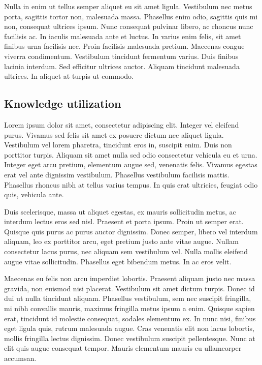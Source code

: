 \documentclass[10pt]{article}
\begin{document}
	Nulla in enim ut tellus semper aliquet eu sit amet ligula. Vestibulum nec metus porta, sagittis tortor non, malesuada massa. Phasellus enim odio, sagittis quis mi non, consequat ultrices ipsum. Nunc consequat pulvinar libero, ac rhoncus nunc facilisis ac. In iaculis malesuada ante et luctus. In varius enim felis, sit amet finibus urna facilisis nec. Proin facilisis malesuada pretium. Maecenas congue viverra condimentum. Vestibulum tincidunt fermentum varius. Duis finibus lacinia interdum. Sed efficitur ultrices auctor. Aliquam tincidunt malesuada ultrices. In aliquet at turpis ut commodo.
		
	
	\subsection{Knowledge utilization}
	
	Lorem ipsum dolor sit amet, consectetur adipiscing elit. Integer vel eleifend purus. Vivamus sed felis sit amet ex posuere dictum nec aliquet ligula. Vestibulum vel lorem pharetra, tincidunt eros in, suscipit enim. Duis non porttitor turpis. Aliquam sit amet nulla sed odio consectetur vehicula eu et urna. Integer eget arcu pretium, elementum augue sed, venenatis felis. Vivamus egestas erat vel ante dignissim vestibulum. Phasellus vestibulum facilisis mattis. Phasellus rhoncus nibh at tellus varius tempus. In quis erat ultricies, feugiat odio quis, vehicula ante.
	
	Duis scelerisque, massa ut aliquet egestas, ex mauris sollicitudin metus, ac interdum lectus eros sed nisl. Praesent et porta ipsum. Proin ut semper erat. Quisque quis purus ac purus auctor dignissim. Donec semper, libero vel interdum aliquam, leo ex porttitor arcu, eget pretium justo ante vitae augue. Nullam consectetur lacus purus, nec aliquam sem vestibulum vel. Nulla mollis eleifend augue vitae sollicitudin. Phasellus eget bibendum metus. In ac eros velit.
	
	Maecenas eu felis non arcu imperdiet lobortis. Praesent aliquam justo nec massa gravida, non euismod nisi placerat. Vestibulum sit amet dictum turpis. Donec id dui ut nulla tincidunt aliquam. Phasellus vestibulum, sem nec suscipit fringilla, mi nibh convallis mauris, maximus fringilla metus ipsum a enim. Quisque sapien erat, tincidunt id molestie consequat, sodales elementum ex. In nunc nisi, finibus eget ligula quis, rutrum malesuada augue. Cras venenatis elit non lacus lobortis, mollis fringilla lectus dignissim. Donec vestibulum suscipit pellentesque. Nunc at elit quis augue consequat tempor. Mauris elementum mauris eu ullamcorper accumsan.
	
\end{document}
